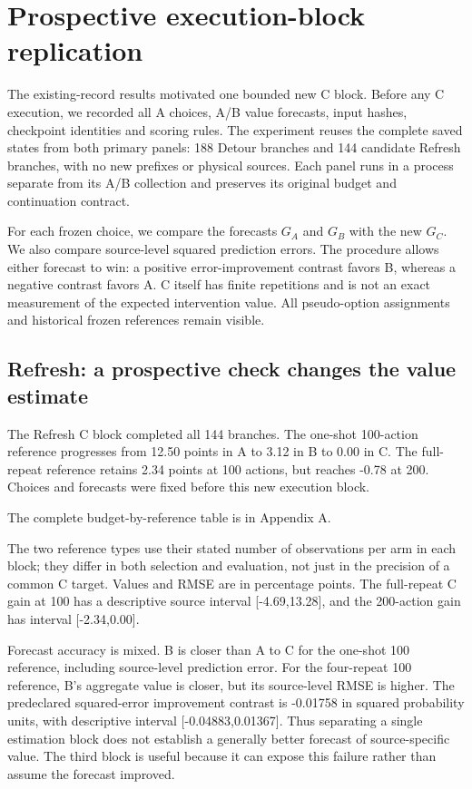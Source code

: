 \section{Prospective execution-block replication}

The existing-record results motivated one bounded new C block. Before any C execution, we recorded all A choices, A/B value forecasts, input hashes, checkpoint identities and scoring rules. The experiment reuses the complete saved states from both primary panels: 188 Detour branches and 144 candidate Refresh branches, with no new prefixes or physical sources. Each panel runs in a process separate from its A/B collection and preserves its original budget and continuation contract.


For each frozen choice, we compare the forecasts $G_A$ and $G_B$ with the new $G_C$. We also compare source-level squared prediction errors. The procedure allows either forecast to win: a positive error-improvement contrast favors B, whereas a negative contrast favors A. C itself has finite repetitions and is not an exact measurement of the expected intervention value. All pseudo-option assignments and historical frozen references remain visible.


\subsection{Refresh: a prospective check changes the value estimate}

The Refresh C block completed all 144 branches. The one-shot 100-action reference progresses from 12.50 points in A to 3.12 in B to 0.00 in C. The full-repeat reference retains 2.34 points at 100 actions, but reaches -0.78 at 200. Choices and forecasts were fixed before this new execution block.


The complete budget-by-reference table is in Appendix A.


The two reference types use their stated number of observations per arm in each block; they differ in both selection and evaluation, not just in the precision of a common C target. Values and RMSE are in percentage points. The full-repeat C gain at 100 has a descriptive source interval [-4.69,13.28], and the 200-action gain has interval [-2.34,0.00].


Forecast accuracy is mixed. B is closer than A to C for the one-shot 100 reference, including source-level prediction error. For the four-repeat 100 reference, B's aggregate value is closer, but its source-level RMSE is higher. The predeclared squared-error improvement contrast is -0.01758 in squared probability units, with descriptive interval [-0.04883,0.01367]. Thus separating a single estimation block does not establish a generally better forecast of source-specific value. The third block is useful because it can expose this failure rather than assume the forecast improved.


